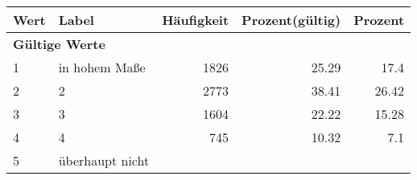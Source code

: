      \begin{longtable}{lXrrr}
     \toprule
     \textbf{Wert} & \textbf{Label} & \textbf{Häufigkeit} & \textbf{Prozent(gültig)} & \textbf{Prozent} \\
     \endhead
     \midrule
     \multicolumn{5}{l}{\textbf{Gültige Werte}}\\

     1 &
     \multicolumn{1}{X}{ in hohem Maße   } &


       \num{1826} &
       \num[round-mode=places,round-precision=2]{25,29} &
         \num[round-mode=places,round-precision=2]{17,4} \\

     2 &
     \multicolumn{1}{X}{ 2   } &


       \num{2773} &
       \num[round-mode=places,round-precision=2]{38,41} &
         \num[round-mode=places,round-precision=2]{26,42} \\

     3 &
     \multicolumn{1}{X}{ 3   } &


       \num{1604} &
       \num[round-mode=places,round-precision=2]{22,22} &
         \num[round-mode=places,round-precision=2]{15,28} \\

     4 &
     \multicolumn{1}{X}{ 4   } &


       \num{745} &
       \num[round-mode=places,round-precision=2]{10,32} &
         \num[round-mode=places,round-precision=2]{7,1} \\

     5 &
     \multicolumn{1}{X}{ überhaupt nicht   } &



\end{longtable}
